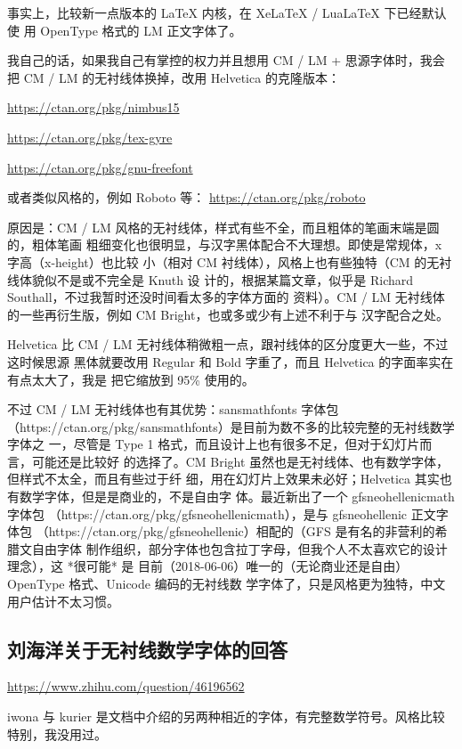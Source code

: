 事实上，比较新一点版本的 LaTeX 内核，在 XeLaTeX / LuaLaTeX 下已经默认使
用 OpenType 格式的 LM 正文字体了。

我自己的话，如果我自己有掌控的权力并且想用 CM / LM + 思源字体时，我会把 CM / LM 的无衬线体换掉，改用 Helvetica 的克隆版本：

\url{https://ctan.org/pkg/nimbus15}

\url{https://ctan.org/pkg/tex-gyre}

\url{https://ctan.org/pkg/gnu-freefont}

或者类似风格的，例如 Roboto 等：
\url{https://ctan.org/pkg/roboto}

原因是：CM / LM 风格的无衬线体，样式有些不全，而且粗体的笔画末端是圆的，粗体笔画
粗细变化也很明显，与汉字黑体配合不大理想。即使是常规体，x 字高（x-height）也比较
小（相对 CM 衬线体），风格上也有些独特（CM 的无衬线体貌似不是或不完全是 Knuth 设
计的，根据某篇文章，似乎是 Richard Southall，不过我暂时还没时间看太多的字体方面的
资料）。CM / LM 无衬线体的一些再衍生版，例如 CM Bright，也或多或少有上述不利于与
汉字配合之处。

Helvetica 比 CM / LM 无衬线体稍微粗一点，跟衬线体的区分度更大一些，不过这时候思源
黑体就要改用 Regular 和 Bold 字重了，而且 Helvetica 的字面率实在有点太大了，我是
把它缩放到 95\% 使用的。

不过 CM / LM 无衬线体也有其优势：sansmathfonts 字体包
（https://ctan.org/pkg/sansmathfonts）是目前为数不多的比较完整的无衬线数学字体之
一，尽管是 Type 1 格式，而且设计上也有很多不足，但对于幻灯片而言，可能还是比较好
的选择了。CM Bright 虽然也是无衬线体、也有数学字体，但样式不太全，而且有些过于纤
细，用在幻灯片上效果未必好；Helvetica 其实也有数学字体，但是是商业的，不是自由字
体。最近新出了一个 gfsneohellenicmath 字体包
（https://ctan.org/pkg/gfsneohellenicmath），是与 gfsneohellenic 正文字体包
（https://ctan.org/pkg/gfsneohellenic）相配的（GFS 是有名的非营利的希腊文自由字体
制作组织，部分字体也包含拉丁字母，但我个人不太喜欢它的设计理念），这 *很可能* 是
目前（2018-06-06）唯一的（无论商业还是自由）OpenType 格式、Unicode 编码的无衬线数
学字体了，只是风格更为独特，中文用户估计不太习惯。

\subsection{刘海洋关于无衬线数学字体的回答}

\url{https://www.zhihu.com/question/46196562}

iwona 与 kurier 是文档中介绍的另两种相近的字体，有完整数学符号。风格比较特别，我没用过。

